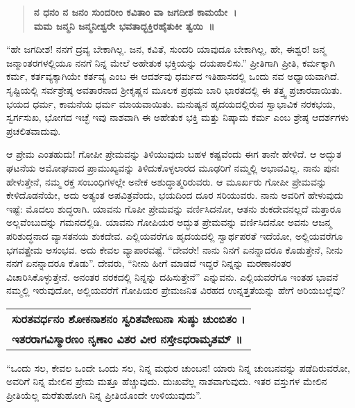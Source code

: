 \begin{verse}
\textbf{ನ ಧನಂ ನ ಜನಂ ಸುಂದರೀಂ ಕವಿತಾಂ ವಾ ಜಗದೀಶ ಕಾಮಯೇ~।}\\\textbf{ಮಮ ಜನ್ಮನಿ ಜನ್ಮನೀಶ್ವರೇ ಭವತಾದ್ಭಕ್ತಿರಹೈತುಕೀ ತ್ವಯಿ~॥}
\end{verse}

“ಹೇ ಜಗದೀಶ! ನನಗೆ ದ್ರವ್ಯ ಬೇಕಾಗಿಲ್ಲ. ಜನ, ಕವಿತೆ, ಸುಂದರಿ ಯಾವುದೂ ಬೇಕಾಗಿಲ್ಲ, ಹೇ, ಈಶ್ವರ! ಜನ್ಮ ಜನ್ಮಾಂತರಗಳಲ್ಲಿಯೂ ನನಗೆ ನಿನ್ನ ಮೇಲೆ ಅಹೇತುಕ ಭಕ್ತಿಯನ್ನು ದಯಪಾಲಿಸು.” ಪ್ರೀತಿಗಾಗಿ ಪ್ರೀತಿ, ಕರ್ಮಕ್ಕಾಗಿ ಕರ್ಮ, ಕರ್ತವ್ಯಕ್ಕಾಗಿಯೇ ಕರ್ತವ್ಯ ಎಂಬ ಈ ಆದರ್ಶವು ಧರ್ಮದ ಇತಿಹಾಸದಲ್ಲಿ ಒಂದು ನವ ಅಧ್ಯಾಯವಾಗಿದೆ. ಸೃಷ್ಟಿಯಲ್ಲಿ ಸರ್ವಶ್ರೇಷ್ಠ ಅವತಾರನಾದ ಶ‍್ರೀಕೃಷ್ಣನ ಮೂಲಕ ಪ್ರಥಮ ಬಾರಿ ಭಾರತದಲ್ಲಿ ಈ ತತ್ತ್ವ ಪ್ರಚಾರವಾಯಿತು. ಭಯದ ಧರ್ಮ, ಕಾಮನೆಯ ಧರ್ಮ ಮಾಯವಾಯಿತು. ಮನುಷ್ಯನ ಹೃದಯದಲ್ಲಿರುವ ಸ್ವಾಭಾವಿಕ ನರಕಭಯ, ಸ್ವರ್ಗಸುಖ, ಭೋಗದ ಇಚ್ಛೆ ಇವು ನಾಶವಾಗಿ ಈ ಅಹೇತುಕ ಭಕ್ತಿ ಮತ್ತು ನಿಷ್ಕಾಮ ಕರ್ಮ ಎಂಬ ಶ್ರೇಷ್ಠ ಆದರ್ಶಗಳು ಪ್ರಚಲಿತವಾದುವು. 

ಆ ಪ್ರೇಮ ಎಂತಹುದು! ಗೋಪೀ ಪ್ರೇಮವನ್ನು ತಿಳಿಯುವುದು ಬಹಳ ಕಷ್ಟವೆಂದು ಈಗ ತಾನೇ ಹೇಳಿದೆ. ಆ ಅದ್ಭುತ ಘಟನೆಯ ಅಮೋಘವಾದ ಪ್ರಾಮುಖ್ಯವನ್ನು ತಿಳಿದುಕೊಳ್ಳಲಾರದ ಮೂಢರಿಗೆ ನಮ್ಮಲ್ಲಿ ಅಭಾವವಿಲ್ಲ. ನಾನು ಪುನಃ ಹೇಳುತ್ತೇನೆ, ನಮ್ಮ ರಕ್ತ ಸಂಬಂಧಿಗಳಲ್ಲೇ ಅನೇಕ ಅಶುದ್ಧಾತ್ಮರಿರುವರು. ಆ ಮೂರ್ಖರು ಗೋಪೀ ಪ್ರೇಮವನ್ನು ಕೇಳಿದೊಡನೆಯೇ, ಅದು ಅತ್ಯಂತ ಅಪವಿತ್ರವೆಂದು, ಭಯದಿಂದ ದೂರ ಸರಿಯುವರು. ನಾನು ಅವರಿಗೆ ಹೇಳುವುದು ಇಷ್ಟೆ: ಮೊದಲು ಶುದ್ಧರಾಗಿ. ಯಾವನು ಗೊಪೀ ಪ್ರೇಮವನ್ನು ವರ್ಣಿಸಿದನೋ, ಆತನು ಶುಕದೇವನಲ್ಲದೆ ಮತ್ತಾರೂ ಅಲ್ಲವೆಂಬುದನ್ನು ಗಮನದಲ್ಲಿಡಿ. ಯಾವನು ಗೋಪಿಯರ ಅದ್ಭುತ ಪ್ರೇಮವನ್ನು ವರ್ಣಿಸಿದನೋ ಅವನು ಆಜನ್ಮ ಪರಿಶುದ್ಧನಾದ ವ್ಯಾಸತನಯ ಶುಕದೇವ. ಎಲ್ಲಿಯವರೆಗೂ ಹೃದಯದಲ್ಲಿ ಸ್ವಾರ್ಥಪರತೆ ಇದೆಯೋ, ಅಲ್ಲಿಯವರೆಗೂ ಭಗವತ್ಪ್ರೇಮ ಅಸಂಭವ. ಅದು ಕೇವಲ ವ್ಯಾಪಾರವಷ್ಟೆ. “ದೇವರೇ! ನಾನು ನಿನಗೆ ಏನನ್ನಾದರೂ ಕೊಡುತ್ತೇನೆ, ನೀನು ನನಗೆ ಏನನ್ನಾದರೂ ಕೊಡು”. ದೇವರು, “ನೀನು ಹೀಗೆ ಮಾಡದೆ ಇದ್ದರೆ ನಿನ್ನನ್ನು ಮರಣಾನಂತರ ವಿಚಾರಿಸಿಕೊಳ್ಳುತ್ತೇನೆ. ಅನಂತರ ನರಕದಲ್ಲಿ ನಿನ್ನನ್ನು ದಹಿಸುತ್ತೇನೆ” ಎನ್ನುವನು. ಎಲ್ಲಿಯವರೆಗೂ ಇಂತಹ ಭಾವನೆ ನಮ್ಮಲ್ಲಿ ಇರುವುದೋ, ಅಲ್ಲಿಯವರೆಗೆ ಗೋಪಿಯರ ಪ್ರೇಮಜನಿತ ವಿರಹದ ಉನ್ನತ್ತತೆಯನ್ನು ಹೇಗೆ ಅರಿಯಬಲ್ಲೆವು?

\begin{longtable}{@{}l@{}}
\textbf{ಸುರತವರ್ಧನಂ ಶೋಕನಾಶನಂ ಸ್ವರಿತವೇಣುನಾ ಸುಷ್ಠು ಚುಂಬಿತಂ ।} \\
\textbf{ಇತರರಾಗವಿಸ್ಮಾರಣಂ ನೃಣಾಂ ವಿತರ ವೀರ ನಸ್ತೇಽಧರಾಮೃತಮ್​ ॥} \\
\end{longtable}

“ಒಂದು ಸಲ, ಕೇವಲ ಒಂದೇ ಒಂದು ಸಲ, ನಿನ್ನ ಮಧುರ ಚುಂಬನ! ಯಾರು ನಿನ್ನ ಚುಂಬನವನ್ನು ಪಡೆದಿರುವರೋ, ಅವರಿಗೆ ನಿನ್ನ ಮೇಲಿನ ಪ್ರೇಮ ಮತ್ತೂ ಹೆಚ್ಚುವುದು. ದುಃಖವೆಲ್ಲ ನಾಶವಾಗುವುದು. ಇತರ ವಸ್ತುಗಳ ಮೇಲಿನ ಪ್ರೀತಿಯೆಲ್ಲ ಮರೆತುಹೋಗಿ ನಿನ್ನ ಪ್ರೀತಿಯೊಂದೇ ಉಳಿಯುವುದು”. 

